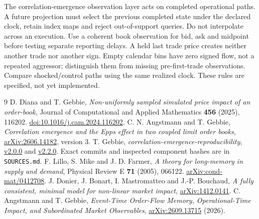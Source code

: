 \documentclass[11pt,a4paper]{article}
\begin{document}
The correlation-emergence observation layer acts on completed operational
paths. A future projection must select the previous completed state under
the declared clock, retain index maps and reject out-of-support queries.
Do not interpolate across an execution. Use a coherent book observation for
bid, ask and midpoint before testing separate reporting delays. A held last
trade price creates neither another trade nor another sign. Empty calendar
bins have zero signed flow, not a repeated aggressor; distinguish them from
missing pre-first-trade observations. Compare shocked/control paths using
the same realized clock. These rules are specified, not yet implemented.

\begin{thebibliography}{9}\small
{} D. Diana and T. Gebbie, \emph{Non-uniformly sampled simulated
price impact of an order-book}, Journal of Computational and Applied
Mathematics \textbf{456} (2025), 116202.
\href{https://doi.org/10.1016/j.cam.2024.116202}{doi:10.1016/j.cam.2024.116202}.
 C. N. Angstmann and T. Gebbie, \emph{Correlation emergence and
the Epps effect in two coupled limit order books},
\href{https://arxiv.org/abs/2606.14182}{arXiv:2606.14182}, version 3.
 T. Gebbie, \emph{correlation-emergence-reproducibility},
\href{https://github.com/timgebbie/correlation-emergence-reproducibility/releases/tag/v2.0.0}{v2.0.0}
and \href{https://github.com/timgebbie/correlation-emergence-reproducibility/releases/tag/v2.2.0}{v2.2.0}.
Exact commits and inspected component hashes are in \texttt{SOURCES.md}.
 F. Lillo, S. Mike and J. D. Farmer, \emph{A theory for
long-memory in supply and demand}, Physical Review E \textbf{71} (2005),
066122. \href{https://arxiv.org/abs/cond-mat/0412708}{arXiv:cond-mat/0412708}.
 J. Donier, J. Bonart, I. Mastromatteo and J.-P. Bouchaud,
\emph{A fully consistent, minimal model for non-linear market impact},
\href{https://arxiv.org/abs/1412.0141}{arXiv:1412.0141}.
 C. Angstmann and T. Gebbie, \emph{Event-Time Order-Flow
Memory, Operational-Time Impact, and Subordinated Market Observables},
\href{https://arxiv.org/abs/2609.13715}{arXiv:2609.13715} (2026).
\end{thebibliography}
\end{document}
